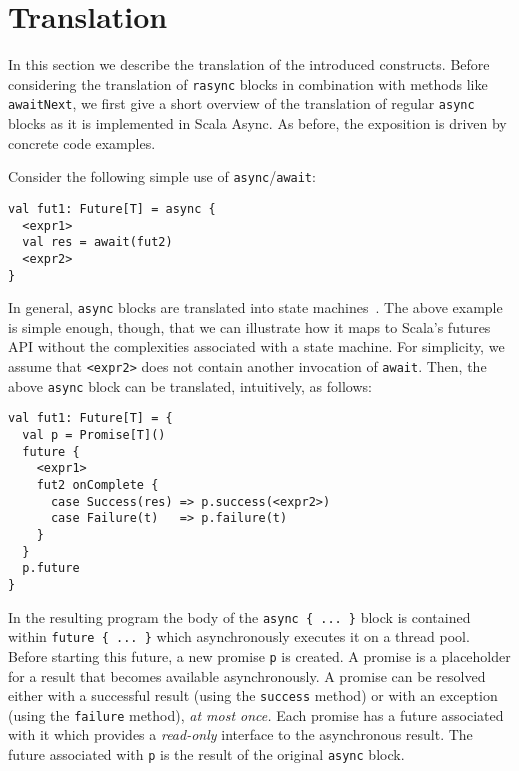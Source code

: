 \documentclass{acm_proc_article-sp}
\begin{document}
\section{Translation}\label{sec:translation}

In this section we describe the translation of the introduced constructs.
Before considering the translation of \verb|rasync| blocks in combination with
methods like \verb|awaitNext|, we first give a short overview of the
translation of regular \verb|async| blocks as it is implemented in Scala
Async. As before, the exposition is driven by concrete code examples.

Consider the following simple use of \verb|async|/\verb|await|:

\begin{lstlisting}
val fut1: Future[T] = async {
  <expr1>
  val res = await(fut2)
  <expr2>
}
\end{lstlisting}

In general, \verb|async| blocks are translated into state
machines~\cite{ScalaAsyncSIP}. The above example is simple enough, though,
that we can illustrate how it maps to Scala's futures API without the
complexities associated with a state machine. For simplicity, we assume that
\verb|<expr2>| does not contain another invocation of \verb|await|. Then, the
above \verb|async| block can be translated, intuitively, as follows:

\begin{lstlisting}
val fut1: Future[T] = {
  val p = Promise[T]()
  future {
    <expr1>
    fut2 onComplete {
      case Success(res) => p.success(<expr2>)
      case Failure(t)   => p.failure(t)
    }
  }
  p.future
}
\end{lstlisting}

In the resulting program the body of the \verb|async { ... }| block is
contained within \verb|future { ... }| which asynchronously executes it on a
thread pool. Before starting this future, a new promise \verb|p| is created. A
promise is a placeholder for a result that becomes available asynchronously. A
promise can be resolved either with a successful result (using the
\verb|success| method) or with an exception (using the \verb|failure| method),
{\em at most once.} Each promise has a future associated with it which
provides a {\em read-only} interface to the asynchronous result. The future
associated with \verb|p| is the result of the original \verb|async| block.
\end{document}
